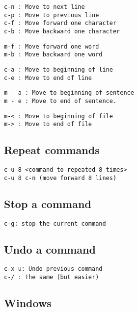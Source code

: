 \documentclass[a4paper, 10pt]{article}
\begin{document}
 \begin{verbatim}
c-n : Move to next line
c-p : Move to previous line
c-f : Move forward one character
c-b : Move backward one character
 \end{verbatim}
 
 \begin{verbatim}
m-f : Move forward one word
m-b : Move backward one word
 \end{verbatim}
 
  \begin{verbatim}
c-a : Move to beginning of line
c-e : Move to end of line
 \end{verbatim}
 
  \begin{verbatim}
m - a : Move to beginning of sentence
m - e : Move to end of sentence.
 \end{verbatim}
 
  \begin{verbatim}
m-< : Move to beginning of file
m-> : Move to end of file
 \end{verbatim}
 
 \subsection*{Repeat commands}
 
  \begin{verbatim}
c-u 8 <command to repeated 8 times>
c-u 8 c-n (move forward 8 lines)
 \end{verbatim}
 
 \subsection*{Stop a command}
 
  \begin{verbatim}
c-g: stop the current command
 \end{verbatim}
 
 \subsection*{Undo a command}
 
  \begin{verbatim}
c-x u: Undo previous command
c-/ : The same (but easier)
 \end{verbatim}
 
\subsection*{Windows}
  
\end{document}
